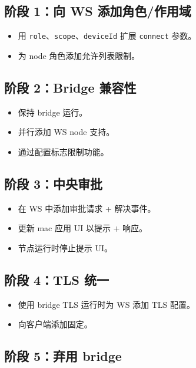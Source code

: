 \subsection{阶段 1：向 WS 添加角色/作用域}


\begin{itemize}
  \item 用 \texttt{role}、\texttt{scope}、\texttt{deviceId} 扩展 \texttt{connect} 参数。
  \item 为 node 角色添加允许列表限制。
\end{itemize}


\subsection{阶段 2：Bridge 兼容性}


\begin{itemize}
  \item 保持 bridge 运行。
  \item 并行添加 WS node 支持。
  \item 通过配置标志限制功能。
\end{itemize}


\subsection{阶段 3：中央审批}


\begin{itemize}
  \item 在 WS 中添加审批请求 + 解决事件。
  \item 更新 mac 应用 UI 以提示 + 响应。
  \item 节点运行时停止提示 UI。
\end{itemize}


\subsection{阶段 4：TLS 统一}


\begin{itemize}
  \item 使用 bridge TLS 运行时为 WS 添加 TLS 配置。
  \item 向客户端添加固定。
\end{itemize}


\subsection{阶段 5：弃用 bridge}


